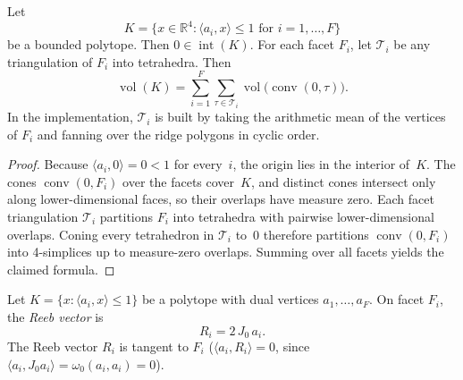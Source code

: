 \begin{unverified}
\begin{lemma}\label{lem:volume-star-triangulation}
Let
\[
  K = \{x \in \mathbb{R}^4 : \langle a_i, x \rangle \leq 1 \text{ for } i=1,\ldots,F\}
\]
be a bounded polytope. Then $0 \in \operatorname{int}(K)$. For each facet
$F_i$, let $\mathcal{T}_i$ be any triangulation of $F_i$ into tetrahedra.
Then
\[
  \operatorname{vol}(K)
  = \sum_{i=1}^F \sum_{\tau \in \mathcal{T}_i}
    \operatorname{vol}\bigl(\operatorname{conv}(0,\tau)\bigr).
\]
\noindent
In the implementation, $\mathcal{T}_i$ is built by taking the arithmetic
mean of the vertices of $F_i$ and fanning over the ridge polygons in cyclic
order.
\end{lemma}

\begin{proof}
Because $\langle a_i, 0 \rangle = 0 < 1$ for every~$i$, the origin lies in
the interior of~$K$. The cones $\operatorname{conv}(0,F_i)$ over the facets
cover~$K$, and distinct cones intersect only along lower-dimensional faces,
so their overlaps have measure zero. Each facet triangulation $\mathcal{T}_i$
partitions $F_i$ into tetrahedra with pairwise lower-dimensional overlaps.
Coning every tetrahedron in $\mathcal{T}_i$ to~$0$ therefore partitions
$\operatorname{conv}(0,F_i)$ into 4-simplices up to measure-zero overlaps.
Summing over all facets yields the claimed formula.
\end{proof}
\end{unverified}



\begin{unverified}
\begin{definition}\label{def:reeb-vector-field}
Let $K = \{x : \langle a_i, x \rangle \leq 1\}$ be a polytope
with dual vertices $a_1, \ldots, a_F$.
On facet $F_i$, the \emph{Reeb vector} is
\[
  R_i = 2\, J_0\, a_i.
\]
The Reeb vector $R_i$ is tangent to $F_i$
($\langle a_i, R_i \rangle = 0$, since
$\langle a_i, J_0 a_i \rangle = \omega_0(a_i, a_i) = 0$).
\end{definition}
\end{unverified}


